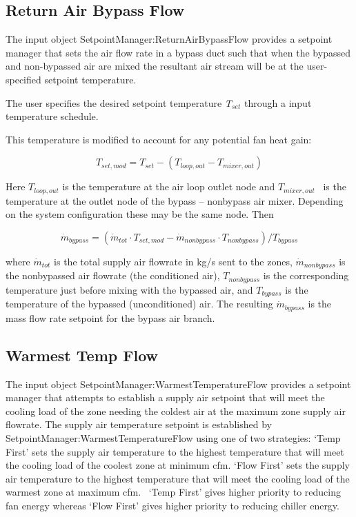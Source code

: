 \subsection{Return Air Bypass Flow}\label{return-air-bypass-flow}

The input object SetpointManager:ReturnAirBypassFlow provides a setpoint manager that sets the air flow rate in a bypass duct such that when the bypassed and non-bypassed air are mixed the resultant air stream will be at the user-specified setpoint temperature.

The user specifies the desired setpoint temperature \emph{T\(_{set}\)} through a input temperature schedule.

This temperature is modified to account for any potential fan heat gain:

\begin{equation}
{T_{set,mod}} = {T_{set}} - ({T_{loop,out}} - {T_{mixer,out}})
\end{equation}

Here \({T_{loop,out}}\) is the temperature at the air loop outlet node and \({T_{mixer,out}}\) ~is the temperature at the outlet node of the bypass -- nonbypass air mixer. Depending on the system configuration these may be the same node. Then

\begin{equation}
{\dot m_{bypass}} = ({\dot m_{tot}}\cdot {T_{set,mod}} - {\dot m_{nonbypass}}\cdot {T_{nonbypass}})/{T_{bypass}}
\end{equation}

where \({\dot m_{tot}}\) is the total supply air flowrate in kg/s sent to the zones, \({\dot m_{nonbypass}}\) is the nonbypassed air flowrate (the conditioned air), \({T_{nonbypass}}\) is the corresponding temperature just before mixing with the bypassed air, and \({T_{bypass}}\) is the temperature of the bypassed (unconditioned) air. The resulting \({\dot m_{bypass}}\) is the mass flow rate setpoint for the bypass air branch.

\subsection{Warmest Temp Flow}\label{warmest-temp-flow}

The input object SetpointManager:WarmestTemperatureFlow provides a setpoint manager that attempts to establish a supply air setpoint that will meet the cooling load of the zone needing the coldest air at the maximum zone supply air flowrate. The supply air temperature setpoint is established by SetpointManager:WarmestTemperatureFlow using one of two strategies: `Temp First' sets the supply air temperature to the highest temperature that will meet the cooling load of the coolest zone at minimum cfm. `Flow First' sets the supply air temperature to the highest temperature that will meet the cooling load of the warmest zone at maximum cfm.~ `Temp First' gives higher priority to reducing fan energy whereas `Flow First' gives higher priority to reducing chiller energy.

